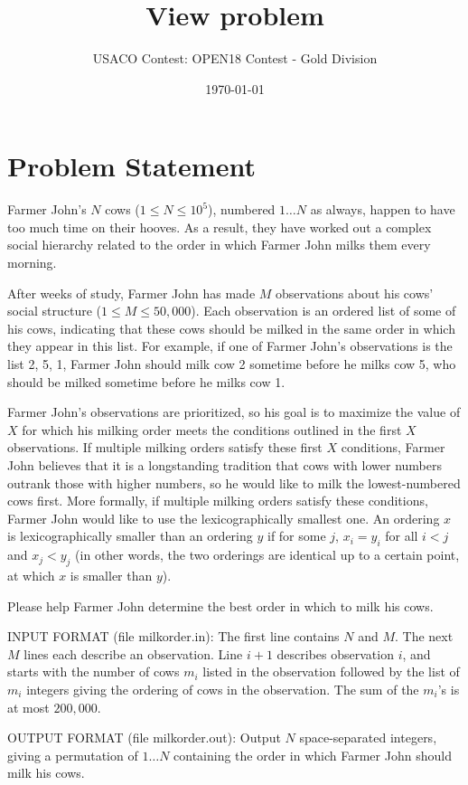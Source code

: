 \documentclass[12pt]{article}
\title{View problem}
\author{USACO Contest: OPEN18 Contest - Gold Division}
\date{\today}
\begin{document}
\maketitle

\section*{Problem Statement}

Farmer John's $N$ cows ($1 \leq N \leq 10^5$), numbered $1 \ldots N$ as always, 
happen to have too much time on their hooves.  As a result, they have worked out
a complex social hierarchy related to the order in which Farmer John milks them
every morning.  

After weeks of study, Farmer John has made $M$ observations about his cows'
social structure ($1 \leq M \leq 50,000$).  Each observation is an ordered list
of some of his cows, indicating that these cows should be milked in the same
order in which they appear in this list.  For example, if one of Farmer John's
observations is the list 2, 5, 1, Farmer John should milk cow 2 sometime before
he milks cow 5, who should be milked sometime before he milks cow 1.

Farmer John's observations are prioritized, so his goal is to maximize the value
of $X$ for which his milking order meets the conditions outlined in the first
$X$ observations.  If multiple milking orders satisfy these first $X$
conditions, Farmer John believes that it is a longstanding tradition that cows
with lower numbers outrank those with higher numbers, so he would like to milk
the lowest-numbered cows first.  More formally, if multiple milking orders
satisfy these conditions, Farmer John would like to use the lexicographically
smallest one.  An ordering $x$ is lexicographically smaller than an ordering $y$
if for some $j$, $x_i = y_i$ for all $i < j$ and $x_j < y_j$ (in other words,
the two orderings are identical up to a certain point, at which $x$ is smaller
than $y$).

Please help Farmer John determine the best order in which to milk his cows.

INPUT FORMAT (file milkorder.in):
The first line contains $N$ and $M$.  The next $M$ lines each describe an
observation. Line $i+1$ describes observation $i$, and starts with the number of
cows $m_i$ listed in the  observation followed by the list of $m_i$ integers
giving the ordering of cows in the observation.  The sum of the $m_i$'s is at
most $200,000$.

OUTPUT FORMAT (file milkorder.out):
Output $N$ space-separated integers, giving a permutation of $1 \ldots N$
containing the order in which Farmer John should milk his cows.
\end{document}
